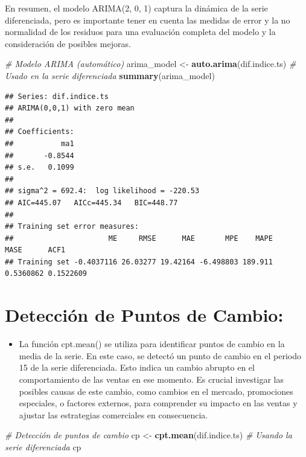 \documentclass[
]{book}
\newenvironment{Shaded}{\begin{snugshade}}{\end{snugshade}}
\newcommand{\CommentTok}[1]{\textcolor[rgb]{0.56,0.35,0.01}{\textit{#1}}}
\newcommand{\FunctionTok}[1]{\textcolor[rgb]{0.13,0.29,0.53}{\textbf{#1}}}
\newcommand{\NormalTok}[1]{#1}
\newcommand{\OtherTok}[1]{\textcolor[rgb]{0.56,0.35,0.01}{#1}}
\providecommand{\tightlist}{%
  \setlength{\itemsep}{0pt}\setlength{\parskip}{0pt}}
\begin{document}
En resumen, el modelo ARIMA(2, 0, 1) captura la dinámica de la serie diferenciada, pero es importante tener en cuenta las medidas de error y la no normalidad de los residuos para una evaluación completa del modelo y la consideración de posibles mejoras.

\begin{Shaded}
\begin{Highlighting}[]
\CommentTok{\# Modelo ARIMA (automático)}
\NormalTok{arima\_model }\OtherTok{\textless{}{-}} \FunctionTok{auto.arima}\NormalTok{(dif.indice.ts) }\CommentTok{\# Usado en la serie diferenciada}
\FunctionTok{summary}\NormalTok{(arima\_model)}
\end{Highlighting}
\end{Shaded}

\begin{verbatim}
## Series: dif.indice.ts 
## ARIMA(0,0,1) with zero mean 
## 
## Coefficients:
##           ma1
##       -0.8544
## s.e.   0.1099
## 
## sigma^2 = 692.4:  log likelihood = -220.53
## AIC=445.07   AICc=445.34   BIC=448.77
## 
## Training set error measures:
##                      ME     RMSE      MAE       MPE    MAPE      MASE      ACF1
## Training set -0.4037116 26.03277 19.42164 -6.498803 189.911 0.5360862 0.1522609
\end{verbatim}

\section{Detección de Puntos de Cambio:}\label{detecciuxf3n-de-puntos-de-cambio}

\begin{itemize}
\tightlist
\item
  La función cpt.mean() se utiliza para identificar puntos de cambio en la media de la serie. En este caso, se detectó un punto de cambio en el periodo 15 de la serie diferenciada. Esto indica un cambio abrupto en el comportamiento de las ventas en ese momento. Es crucial investigar las posibles causas de este cambio, como cambios en el mercado, promociones especiales, o factores externos, para comprender su impacto en las ventas y ajustar las estrategias comerciales en consecuencia.
\end{itemize}

\begin{Shaded}
\begin{Highlighting}[]
\CommentTok{\# Detección de puntos de cambio}
\NormalTok{cp }\OtherTok{\textless{}{-}} \FunctionTok{cpt.mean}\NormalTok{(dif.indice.ts) }\CommentTok{\# Usando la serie diferenciada}
\NormalTok{cp}
\end{Highlighting}
\end{Shaded}
\end{document}
